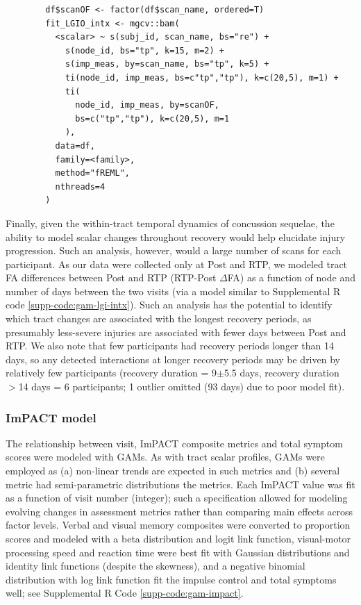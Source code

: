 \documentclass[12pt]{article}
\begin{document}
\begin{equ}[H]
	\begin{lstlisting}
		df$scanOF <- factor(df$scan_name, ordered=T)
		fit_LGIO_intx <- mgcv::bam(
		  <scalar> ~ s(subj_id, scan_name, bs="re") +
		    s(node_id, bs="tp", k=15, m=2) +
		    s(imp_meas, by=scan_name, bs="tp", k=5) +
		    ti(node_id, imp_meas, bs=c"tp","tp"), k=c(20,5), m=1) +
		    ti(
		      node_id, imp_meas, by=scanOF,
		      bs=c("tp","tp"), k=c(20,5), m=1
		    ),
		  data=df,
		  family=<family>,
		  method="fREML",
		  nthreads=4
		)
	\end{lstlisting}
	\caption{Tract scalars are modeled as a function of separate 1D node and ImPACT smooths as well as a 2D tensor product interaction surface, with ordered factors used to compare Post and RTP surfaces to Base. \lstinline{imp_meas} = ImPACT composite or total symptom measure.}
	\label{code:gam-lgio-intx}
\end{equ}

Finally, given the within-tract temporal dynamics of concussion sequelae, the ability to model scalar changes throughout recovery would help elucidate injury progression. Such an analysis, however, would a large number of scans for each participant. As our data were collected only at Post and RTP, we modeled tract FA differences between Post and RTP (RTP-Post $\Delta$FA) as a function of node and number of days between the two visits (via a model similar to Supplemental R code \ref{supp-code:gam-lgi-intx}). Such an analysis has the potential to identify which tract changes are associated with the longest recovery periods, as presumably less-severe injuries are associated with fewer days between Post and RTP. We also note that few participants had recovery periods longer than 14 days, so any detected interactions at longer recovery periods may be driven by relatively few participants (recovery duration = 9$\pm$5.5 days, recovery duration $>$14 days = 6 participants; 1 outlier omitted (93 days) due to poor model fit).

\subsubsection{ImPACT model}
\label{sssec:meth-gam-impact}
The relationship between visit, ImPACT composite metrics and total symptom scores were modeled with GAMs. As with tract scalar profiles, GAMs were employed as (a) non-linear trends are expected in such metrics and (b) several metric had semi-parametric distributions the metrics. Each ImPACT value was fit as a function of visit number (integer); such a specification allowed for modeling evolving changes in assessment metrics rather than comparing main effects across factor levels. Verbal and visual memory composites were converted to proportion scores and modeled with a beta distribution and logit link function, visual-motor processing speed and reaction time were best fit with Gaussian distributions and identity link functions (despite the skewness), and a negative binomial distribution with log link function fit the impulse control and total symptoms well; see Supplemental R Code \ref{supp-code:gam-impact}.
\end{document}
